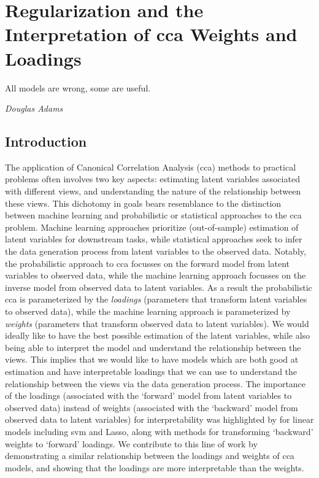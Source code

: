 \graphicspath{{chapters/loadings/}}
\chapter{Regularization and the Interpretation of \acrshort{cca} Weights and Loadings}\label{chap:loadings}
\minitoc
\epigraph{All models are wrong, some are useful.}{\textit{Douglas Adams}}
\section{Introduction}

The application of Canonical Correlation Analysis (\acrshort{cca}) methods to practical problems often involves two key aspects: estimating latent variables associated with different views, and understanding the nature of the relationship between these views.
This dichotomy in goals bears resemblance to the distinction between machine learning and probabilistic or statistical approaches to the \acrshort{cca} problem.
Machine learning approaches prioritize (out-of-sample) estimation of latent variables for downstream tasks, while statistical approaches seek to infer the data generation process from latent variables to the observed data.
Notably, the probabilistic approach to \acrshort{cca} focusses on the forward model from latent variables to observed data, while the machine learning approach focusses on the inverse model from observed data to latent variables.
As a result the probabilistic \acrshort{cca} is parameterized by the \textit{loadings} (parameters that transform latent variables to observed data), while the machine learning approach is parameterized by \textit{weights} (parameters that transform observed data to latent variables).
We would ideally like to have the best possible estimation of the latent variables, while also being able to interpret the model and understand the relationship between the views.
This implies that we would like to have models which are both good at estimation and have interpretable \gls{loadings} that we can use to understand the relationship between the views via the data generation process.
The importance of the \gls{loadings} (associated with the `forward' model from latent variables to observed data) instead of weights (associated with the `backward' model from observed data to latent variables) for interpretability was highlighted by \cite{haufe2014interpretation} for linear models including \acrshort{svm} and Lasso, along with methods for transforming `backward' weights to `forward' loadings.
We contribute to this line of work by demonstrating a similar relationship between the \gls{loadings} and weights of \acrshort{cca} models, and showing that the \gls{loadings} are more interpretable than the weights.

